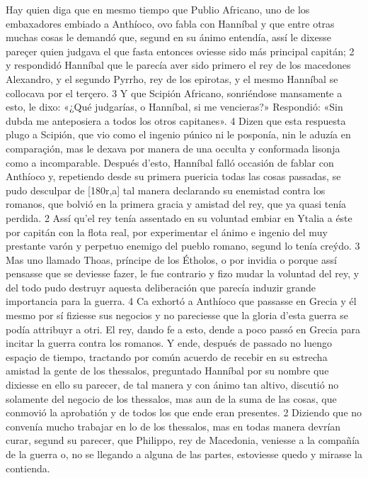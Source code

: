 \documentclass[11pt,twoside]{article}\makeatletter
\def\persName{}\def\name{}
\begin{document}
\pend
{} Hay quien diga que en mesmo tiempo que Publio Africano, uno de los embaxadores embiado a Anthíoco, ovo fabla con  {\persName Hanníbal} y que entre otras muchas cosas le demandó que, segund en su ánimo entendía, assí le dixesse pareçer quien judgava el que fasta entonces oviesse sido más principal capitán; 2 y respondidó  {\persName Hanníbal} que le parecía aver sido primero el rey de los macedones Alexandro, y el segundo Pyrrho, rey de los epirotas, y el mesmo  {\persName Hanníbal} se collocava por el terçero. 3 Y que Scipión Africano, sonriéndose mansamente a esto, le dixo: «¿Qué judgarías, o  {\persName Hanníbal}, si me vencieras?» Respondió: «Sin dubda me anteposiera a todos los otros capitanes». 4 Dizen que esta respuesta plugo a Scipión, que vio como el ingenio púnico ni le posponía, nin le aduzía en comparaçión, mas le dexava por manera de una occulta y conformada lisonja como a incomparable.
\pend
{} Después d’esto,  {\persName Hanníbal} falló occasión de fablar con Anthíoco y, repetiendo desde su primera puericia todas las cosas passadas, se pudo desculpar de %
[180r,a] tal manera declarando su enemistad contra los romanos, que bolvió en la primera gracia y amistad del rey, que ya quasi tenía perdida. 2 Assí qu’el rey tenía assentado en su voluntad embiar en Ytalia a éste por capitán con la flota real, por experimentar el ánimo e ingenio del muy prestante varón y perpetuo enemigo del pueblo romano, segund lo tenía creýdo. 3 Mas uno llamado Thoas, príncipe de los Étholos, o por invidia o porque assí pensasse que se deviesse fazer, le fue contrario y fizo mudar la voluntad del rey, y del todo pudo destruyr aquesta deliberación que parecía induzir grande importancia para la guerra. 4 Ca exhortó a Anthíoco que passasse en Grecia y él mesmo por sí fiziesse sus negocios y no pareciesse que la gloria d’esta guerra se podía attribuyr a otri. El rey, dando fe a esto, dende a poco passó en Grecia para incitar la guerra contra los romanos.
\pend
{} Y ende, después de passado no luengo espaçio de tiempo, tractando por común acuerdo de recebir en su estrecha amistad la gente de los thessalos, preguntado  {\persName Hanníbal} por su nombre que dixiesse en ello su parecer, de tal manera y con ánimo tan altivo, discutió no solamente del negocio de los thessalos, mas aun de la suma de las cosas, que conmovió la aprobatión y  de todos los que ende eran presentes. 2 Diziendo que no convenía mucho trabajar en lo de los thessalos, mas en todas manera devrían curar, segund su parecer, que Philippo, rey de Macedonia, veniesse a la compañía de la guerra o, no se llegando a alguna de las partes, estoviesse quedo y mirasse la contienda.
\end{document}
